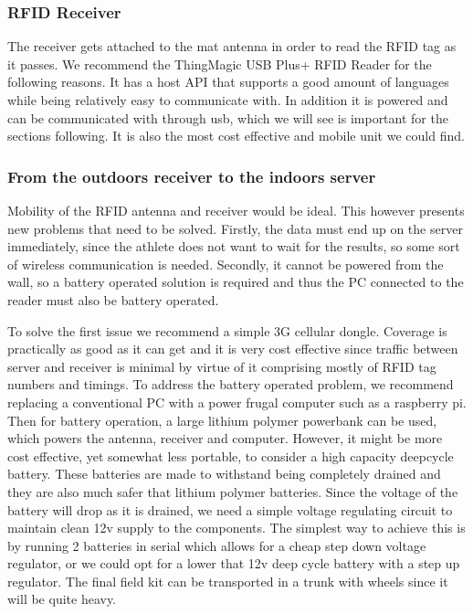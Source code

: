 \documentclass{article}
\begin{document}
\subsubsection{RFID Receiver}
The receiver gets attached to the mat antenna in order to read the RFID tag as it passes. We recommend the ThingMagic USB Plus+ RFID Reader for the following reasons. It has a host API that supports a good amount of languages while being relatively easy to communicate with. In addition it is powered and can be communicated with through usb, which we will see is important for the sections following. It is also the most cost effective and mobile unit we could find.

\subsubsection{From the outdoors receiver to the indoors server}
Mobility of the RFID antenna and receiver would be ideal. This however presents new problems that need to be solved. Firstly, the data must end up on the server immediately, since the athlete does not want to wait for the results, so some sort of wireless communication is needed. Secondly, it cannot be powered from the wall, so a battery operated solution is required and thus the PC connected to the reader must also be battery operated.
\par
\bigskip
\noindent
To solve the first issue we recommend a simple 3G cellular dongle. Coverage is practically as good as it can get and it is very cost effective since traffic between server and receiver is minimal by virtue of it comprising mostly of RFID tag numbers and timings. To address the battery operated problem, we recommend replacing a conventional PC with a power frugal computer such as a raspberry pi. Then for battery operation, a large lithium polymer powerbank can be used, which powers the antenna, receiver and computer. However, it might be more cost effective, yet somewhat less portable, to consider a high capacity deepcycle battery. These batteries are made to withstand being completely drained and they are also much safer that lithium polymer batteries. Since the voltage of the battery will drop as it is drained, we need a simple voltage regulating circuit to maintain clean 12v supply to the components. The simplest way to achieve this is by running 2 batteries in serial which allows for a cheap step down voltage regulator, or we could opt for a lower that 12v deep cycle battery with a step up regulator. The final field kit can be transported in a trunk with wheels since it will be quite heavy.  
 
\end{document}
